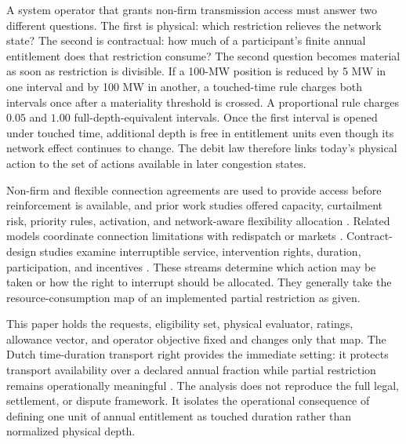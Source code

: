 \documentclass[10pt,journal]{IEEEtran}
\begin{document}
A system operator that grants non-firm transmission access must answer two different questions. The first is physical: which restriction relieves the network state? The second is contractual: how much of a participant's finite annual entitlement does that restriction consume? The second question becomes material as soon as restriction is divisible. If a 100-MW position is reduced by 5 MW in one interval and by 100 MW in another, a touched-time rule charges both intervals once after a materiality threshold is crossed. A proportional rule charges $0.05$ and $1.00$ full-depth-equivalent intervals. Once the first interval is opened under touched time, additional depth is free in entitlement units even though its network effect continues to change. The debit law therefore links today's physical action to the set of actions available in later congestion states.

Non-firm and flexible connection agreements are used to provide access before reinforcement is available, and prior work studies offered capacity, curtailment risk, priority rules, activation, and network-aware flexibility allocation \cite{AnayaPollitt2015,DzamarijaKeane2013,HubertColey2021,Bjarghov2024,DeSanti2025,Monterde2025,SeifertBjarghovBakker2026}. Related models coordinate connection limitations with redispatch or markets \cite{Oikonomou2020,Tsaousoglou2021,VanDerHolst2024Activation,VanDerHolst2026RiskAware}. Contract-design studies examine interruptible service, intervention rights, duration, participation, and incentives \cite{ChaoWilson1987,ChaoWilson1990,OrenSmith1992,CavesHerriges1992,FahriogluAlvarado2000,Nouicer2023}. These streams determine which action may be taken or how the right to interrupt should be allocated. They generally take the resource-consumption map of an implemented partial restriction as given.

This paper holds the requests, eligibility set, physical evaluator, ratings, allowance vector, and operator objective fixed and changes only that map. The Dutch time-duration transport right provides the immediate setting: it protects transport availability over a declared annual fraction while partial restriction remains operationally meaningful \cite{ACM2024ATR,ACM2026TDTR}. The analysis does not reproduce the full legal, settlement, or dispute framework. It isolates the operational consequence of defining one unit of annual entitlement as touched duration rather than normalized physical depth.
\end{document}
